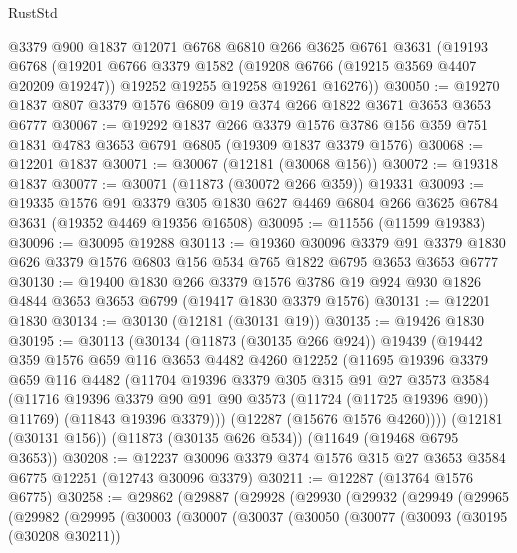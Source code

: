 \begin{lexlean}{RustStd}
\begin{coremodule}
    @3379
    @900
    @1837
    @12071
    @6768
    @6810
    @266
    @3625
    @6761
    @3631
    (@19193
      @6768
      (@19201
        @6766
        @3379
        @1582
        (@19208 @6766 (@19215 @3569 @4407 @20209 @19247))
        @19252
        @19255
        @19258
        @19261
        @16276))
@30050 := @19270 @1837 @807 @3379 @1576 @6809 @19 @374 @266 @1822 @3671 @3653 @3653 @6777
@30067 := @19292
    @1837
    @266
    @3379
    @1576
    @3786
    @156
    @359
    @751
    @1831
    @4783
    @3653
    @6791
    @6805
    (@19309 @1837 @3379 @1576)
@30068 := @12201 @1837
@30071 := @30067 (@12181 (@30068 @156))
@30072 := @19318 @1837
@30077 := @30071 (@11873 (@30072 @266 @359)) @19331
@30093 := @19335
    @1576
    @91
    @3379
    @305
    @1830
    @627
    @4469
    @6804
    @266
    @3625
    @6784
    @3631
    (@19352 @4469 @19356 @16508)
@30095 := @11556 (@11599 @19383)
@30096 := @30095 @19288
@30113 := @19360
    @30096
    @3379
    @91
    @3379
    @1830
    @626
    @3379
    @1576
    @6803
    @156
    @534
    @765
    @1822
    @6795
    @3653
    @3653
    @6777
@30130 := @19400
    @1830
    @266
    @3379
    @1576
    @3786
    @19
    @924
    @930
    @1826
    @4844
    @3653
    @3653
    @6799
    (@19417 @1830 @3379 @1576)
@30131 := @12201 @1830
@30134 := @30130 (@12181 (@30131 @19))
@30135 := @19426 @1830
@30195 := @30113
    (@30134
      (@11873 (@30135 @266 @924))
      @19439
      (@19442
        @359
        @1576
        @659
        @116
        @3653
        @4482
        @4260
        @12252
        (@11695
          @19396
          @3379
          @659
          @116
          @4482
          (@11704
            @19396
            @3379
            @305
            @315
            @91
            @27
            @3573
            @3584
            (@11716 @19396 @3379 @90 @91 @90 @3573 (@11724 (@11725 @19396 @90)) @11769)
            (@11843 @19396 @3379)))
        (@12287 (@15676 @1576 @4260))))
    (@12181 (@30131 @156))
    (@11873 (@30135 @626 @534))
    (@11649 (@19468 @6795 @3653))
@30208 := @12237 @30096 @3379 @374 @1576 @315 @27 @3653 @3584 @6775 @12251 (@12743 @30096 @3379)
@30211 := @12287 (@13764 @1576 @6775)
@30258 := @29862
    (@29887
      (@29928
        (@29930
          (@29932
            (@29949
              (@29965
                (@29982
                  (@29995
                    (@30003
                      (@30007
                        (@30037
                          (@30050
                            (@30077
                              (@30093
                                (@30195 (@30208 @30211))

\end{coremodule}
\end{lexlean}
